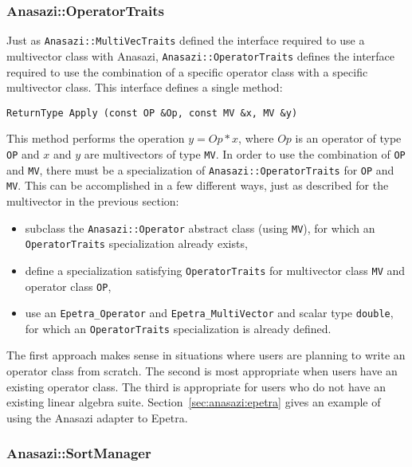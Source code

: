 \subsubsection{Anasazi::OperatorTraits}
\label{sec:anasazi:opt}

Just as \verb!Anasazi::MultiVecTraits! defined the interface required to use a
multivector class with Anasazi, \verb!Anasazi::OperatorTraits! defines the
interface required to use the combination of a specific operator class with a
specific multivector class. This interface defines a single method:
\begin{verbatim}
ReturnType Apply (const OP &Op, const MV &x, MV &y)
\end{verbatim}
This method performs the operation $y = Op*x$, where $Op$ is an operator of type
\verb!OP! and $x$ and $y$ are multivectors of type \verb!MV!. In order to use the
combination of \verb!OP! and \verb!MV!, there must be a specialization of
\verb!Anasazi::OperatorTraits! for \verb!OP! and \verb!MV!. This can be
accomplished in a few different ways, just as described for the multivector in
the previous section:
\begin{itemize}
\item subclass the \verb!Anasazi::Operator! abstract class (using
\verb!MV!), for which an \verb!OperatorTraits! specialization already exists,
\item define a specialization satisfying \verb!OperatorTraits! for multivector
class \verb!MV! and operator class \verb!OP!,
\item use an \verb!Epetra_Operator! and \verb!Epetra_MultiVector! and scalar
type \verb!double!, for which an \verb!OperatorTraits! specialization is already
defined.
\end{itemize}

The first approach makes sense in situations where users are planning to write
an operator class from scratch. The second is most appropriate when users have
an existing operator class. The third is appropriate for users who do not have
an existing linear algebra suite. Section~\ref{sec:anasazi:epetra} gives an
example of using the Anasazi adapter to Epetra.

\subsubsection{Anasazi::SortManager}
\label{sec:anasazi:sm}

